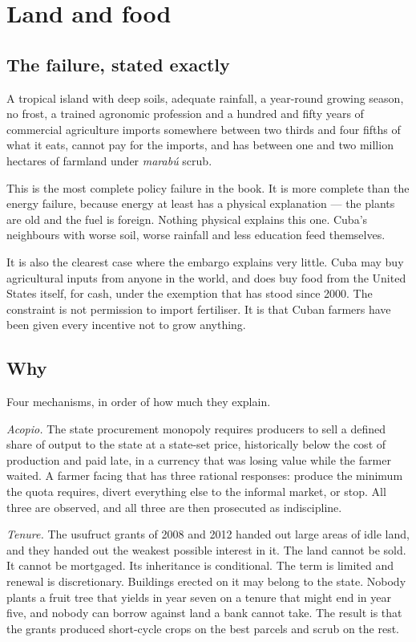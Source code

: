 \chapter{Land and food}
\label{ch:land}

\section{The failure, stated exactly}

A tropical island with deep soils, adequate rainfall, a year-round growing
season, no frost, a trained agronomic profession and a hundred and fifty years of
commercial agriculture imports somewhere between two thirds and four fifths of
what it eats, cannot pay for the imports, and has between one and two million
hectares of farmland under \emph{marab\'u} scrub.\unv{}

This is the most complete policy failure in the book. It is more complete than
the energy failure, because energy at least has a physical explanation --- the
plants are old and the fuel is foreign. Nothing physical explains this one. Cuba's
neighbours with worse soil, worse rainfall and less education feed themselves.

It is also the clearest case where the embargo explains very little. Cuba may buy
agricultural inputs from anyone in the world, and does buy food from the United
States itself, for cash, under the exemption that has stood since 2000. The
constraint is not permission to import fertiliser. It is that Cuban farmers have
been given every incentive not to grow anything.

\section{Why}

Four mechanisms, in order of how much they explain.

\emph{Acopio.} The state procurement monopoly requires producers to sell a
defined share of output to the state at a state-set price, historically below the
cost of production and paid late, in a currency that was losing value while the
farmer waited. A farmer facing that has three rational responses: produce the
minimum the quota requires, divert everything else to the informal market, or
stop. All three are observed, and all three are then prosecuted as indiscipline.

\emph{Tenure.} The usufruct grants of 2008 and 2012 handed out large areas of
idle land, and they handed out the weakest possible interest in it. The land
cannot be sold. It cannot be mortgaged. Its inheritance is conditional. The term
is limited and renewal is discretionary. Buildings erected on it may belong to
the state. Nobody plants a fruit tree that yields in year seven on a tenure that
might end in year five, and nobody can borrow against land a bank cannot take.
The result is that the grants produced short-cycle crops on the best parcels and
scrub on the rest.

